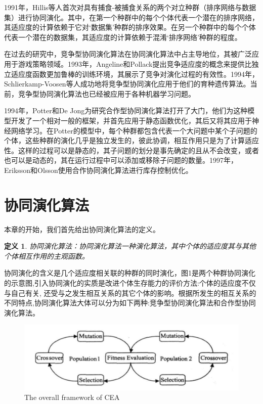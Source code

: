 \documentclass[a4paper]{article}
\newtheorem{definition}{\hspace{2em}定义}
\begin{document}
    1991年，Hillis等人首次对具有捕食-被捕食关系的两个对立种群（排序网络与数据集）进行协同演化\cite{hillis1990co}。其中，在第一个种群中的每个个体代表一个潜在的排序网络，其适应度的计算依赖于它对‘数据集’种群的排序效果。在另一个种群中的每个个体代表一个潜在的数据集，其适应度的计算依赖于混淆‘排序网络’种群的程度。
    
    在过去的研究中，竞争型协同演化算法在协同演化算法中占主导地位，其被广泛应用于游戏策略领域\cite{rosin1995methods,pollack1998co}。1993年，Angeline和Pollack提出竞争适应度的概念来提供比独立适应度函数更加鲁棒的训练环境，其展示了竞争对演化过程的有效性。1994年，Schlierkamp-Voosen等人成功地将竞争型协同演化应用于他们的育种遗传算法。当前，竞争型协同演化算法也已经被应用于各种机器学习问题。
    
    1994年，Potter和De Jong为研究合作型协同演化算法打开了大门\cite{potter1994cooperative}，他们为这种模型开发了一个相对一般的框架，并首先应用于静态函数优化，其后又将其应用于神经网络学习。在Potter的模型中，每个种群都包含代表一个大问题中某个子问题的个体，这些种群的演化几乎是独立发生的，彼此协调，相互作用只是为了计算适应性。这样的过程可以是静态的，其子问题的划分是事先确定的且从不会改变，或者也可以是动态的，其在运行过程中可以添加或移除子问题的数量。1997年，Eriksson和Olsson使用合作协同演化算法进行库存控制优化。


    \newpage
    \section{协同演化算法}

    本章的开始，我们首先给出协同演化算法的定义。
    
    \begin{definition}
        协同演化算法：协同演化算法一种演化算法，其中个体的适应度其与其他个体相互作用的主观函数。
    \end{definition}

    协同演化的含义是几个适应度相关联的种群的同时演化，图1是两个种群协同演化的示意图,引入协同演化的实质是改进个体生存能力的评价方法:个体的适应度不仅与自己有关, 还受与之发生相互关系的其它个体的影响。根据所发生的相互关系的不同特点,协同演化算法大体可以分为如下两种:竞争型协同演化算法和合作型协同演化算法。

    \begin{figure}[H]
        \centering
        \includegraphics[width=0.8\linewidth]{./images/cea_framework.png}
        \caption{The overall framework of CEA}
        \label{fig:cea_framework}
    \end{figure}
\end{document}
